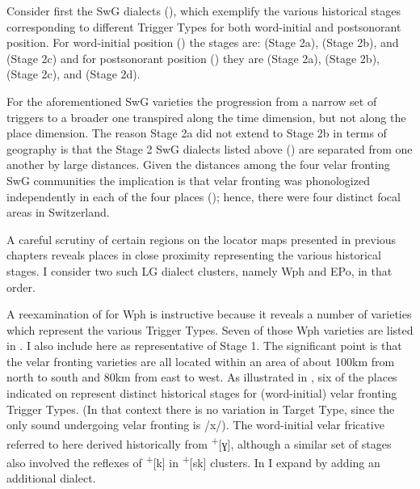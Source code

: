 Consider first the SwG dialects (), which exemplify the various historical stages corresponding to different Trigger Types for both word-initial and postsonorant position. For word-initial position () the stages are:  (Stage 2a),  (Stage 2b), and  (Stage 2c) and for postsonorant position () they are   (Stage 2a),  (Stage 2b),  (Stage 2c), and  (Stage 2d).

For the aforementioned SwG varieties the progression from a narrow set of triggers to a broader one transpired along the time dimension, but not along the place dimension. The reason Stage 2a did not extend to Stage 2b in terms of geography is that the Stage 2 SwG dialects listed above () are separated from one another by large distances. Given the distances among the four velar fronting SwG communities the implication is that velar fronting was phonologized independently in each of the four places (); hence, there were four distinct focal areas in Switzerland.

A careful scrutiny of certain regions on the locator maps presented in previous chapters reveals places in close proximity representing the various historical stages. I consider two such LG dialect clusters, namely Wph and EPo, in that order.

A reexamination of  for Wph is instructive because it reveals a number of varieties which represent the various Trigger Types. Seven of those Wph varieties are listed in . I also include here  as representative of Stage 1. The significant point is that the velar fronting varieties are all located within an area of about 100km from north to south and 80km from east to west. As illustrated in , six of the places indicated on  represent distinct historical stages for (word-initial) velar fronting Trigger Types. (In that context there is no variation in Target Type, since the only sound undergoing velar fronting is /x/). The word-initial velar fricative referred to here derived historically from  \textsuperscript{+}[ɣ], although a similar set of stages also involved the reflexes of \textsuperscript{+}[k] in  \textsuperscript{+}[sk] clusters. In  I expand  by adding an additional dialect.

